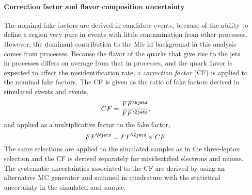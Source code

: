 \paragraph{Correction factor and flavor composition uncertainty}
The nominal fake factors are derived in \Zjets candidate events, because of the ability to define a region very pure in \Zjets events with little contamination from other processes. However, the dominant contribution to the Mis-Id background in this analysis comes from \Wjets processes. 
Because the flavor of the quarks that give rise to the jets in \Zjets processes differs on average from that in \Wjets processes, and the quark flavor is expected to affect the misidentification rate, a \emph{correction factor} (CF) is applied to the nominal fake factors.
The CF is given as the ratio of fake factors derived in simulated \Wjets events and \Zjets events, 
\begin{equation}
    CF = \frac{FF^{\Wjets}}{FF^{\Zjets}},
\end{equation}
and applied as a multiplicative factor to the fake factor,
\begin{equation}
    FF^{\Wjets} = FF^{\Zjets} \times CF.
\end{equation}
The same selections are applied to the simulated samples as in the three-lepton \Zjets selection and the CF is derived separately for misidentified electrons and muons. 
The systematic uncertainties associated to the CF are derived by using an alternative MC generator and summed in quadrature with the statistical uncertainty in the simulated \Wjets and \Zjets sample.


\begin{table}[ht]
    \begin{center}
    
    \end{center}
    \caption{Summary of the fake factors from the $Z$+jets estimate with uncertainties. All uncertainties are quoted in percent on the nominal value. More information on the different uncertainty components is given in the text.
    }
    \label{tab:ZjetsFF-uncertainties}
\end{table}


